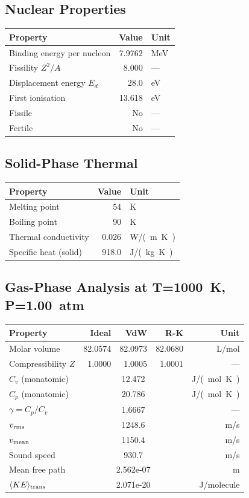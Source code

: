 \documentclass[11pt,a4paper]{article}
\begin{document}
\subsection{Nuclear Properties}
\begin{tabular}{lrl}
  \toprule
  Property & Value & Unit \\
  \midrule
  Binding energy per nucleon & 7.9762 & \si{MeV} \\
  Fissility $Z^2/A$ & 8.000 & --- \\
  Displacement energy $E_d$ & 28.0 & \si{eV} \\
  First ionisation & 13.618 & \si{eV} \\
  Fissile & No & --- \\
  Fertile & No & --- \\
  \bottomrule
\end{tabular}

\subsection{Solid-Phase Thermal}
\begin{tabular}{lrl}
  \toprule
  Property & Value & Unit \\
  \midrule
  Melting point & 54 & \si{K} \\
  Boiling point & 90 & \si{K} \\
  Thermal conductivity & 0.026 & \si{W/(m.K)} \\
  Specific heat (solid) & 918.0 & \si{J/(kg.K)} \\
  \bottomrule
\end{tabular}

\subsection{Gas-Phase Analysis at T=\SI{1000}{K}, P=\SI{1.00}{atm}}
\begin{tabular}{lrrrr}
  \toprule
  Property & Ideal & VdW & R-K & Unit \\
  \midrule
  Molar volume & 82.0574 & 82.0973 & 82.0680 & \si{L/mol} \\
  Compressibility $Z$ & 1.0000 & 1.0005 & 1.0001 & --- \\
  \midrule
  $C_v$ (monatomic) & \multicolumn{3}{c}{12.472} & \si{J/(mol.K)} \\
  $C_p$ (monatomic) & \multicolumn{3}{c}{20.786} & \si{J/(mol.K)} \\
  $\gamma = C_p/C_v$ & \multicolumn{3}{c}{1.6667} & --- \\
  $v_{\rm rms}$ & \multicolumn{3}{c}{1248.6} & \si{m/s} \\
  $v_{\rm mean}$ & \multicolumn{3}{c}{1150.4} & \si{m/s} \\
  Sound speed & \multicolumn{3}{c}{930.7} & \si{m/s} \\
  Mean free path & \multicolumn{3}{c}{2.562e-07} & \si{m} \\
  $\langle KE \rangle_{\rm trans}$ & \multicolumn{3}{c}{2.071e-20} & \si{J/molecule} \\
  \bottomrule
\end{tabular}
\end{document}
